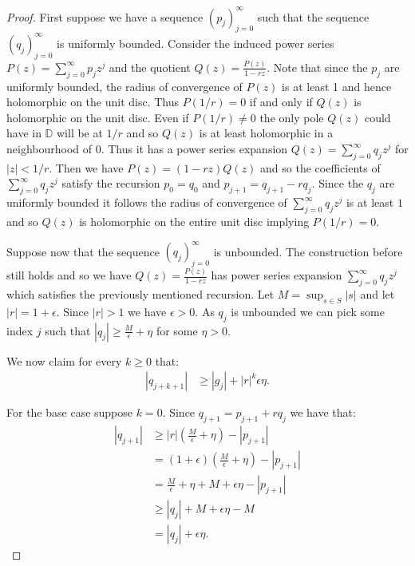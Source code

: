 \documentclass[11pt]{amsart}
\numberwithin{theorem}{section} %
\numberwithin{corollary}{section}
\numberwithin{lemma}{section}
\numberwithin{proposition}{section}
\numberwithin{definition}{section}
\begin{document}
\begin{proof}
First suppose we have a sequence $(p_j)_{j=0}^\infty$ such that the sequence $(q_j)_{j=0}^\infty$ is uniformly bounded. Consider the induced power series $P(z) = \sum_{j=0}^\infty p_jz^j$ and the quotient $Q(z) = \frac{P(z)}{1-rz}$. Note that since the $p_j$ are uniformly bounded, the radius of convergence of $P(z)$ is at least 1 and hence holomorphic on the unit disc. Thus $P(1/r) = 0$ if and only if $Q(z)$ is holomorphic on the unit disc. Even if $P(1/r) \neq 0$ the only pole $Q(z)$ could have in $\mathbb{D}$ will be at $1/r$ and so $Q(z)$ is at least holomorphic in a neighbourhood of $0$. Thus it has a power series expansion $Q(z) = \sum_{j=0}^\infty q_jz^j$ for $|z| < 1/r$. Then we have $P(z) = (1-rz)Q(z)$ and so the coefficients of $\sum_{j=0}^\infty q_jz^j$ satisfy the recursion $p_0 = q_0$ and $p_{j+1} = q_{j+1} - rq_{j}$. Since the $q_j$ are uniformly bounded it follows the radius of convergence of $\sum_{j=0}^\infty q_jz^j$ is at least $1$ and so $Q(z)$ is holomorphic on the entire unit disc implying $P(1/r) = 0$.



\vspace{10pt}

Suppose now that the sequence $(q_j)_{j=0}^\infty$ is unbounded. The construction before still holds and so we have $Q(z) = \frac{P(z)}{1-rz}$ has power series expansion $\sum_{j=0}^\infty q_jz^j$ which satisfies the previously mentioned recursion. Let $M = \sup_{s \in S} |s|$ and let $|r| = 1+\epsilon$. Since $|r| > 1$ we have $\epsilon > 0$. As $q_j$ is unbounded we can pick some index $j$ such that $|q_j| \geqslant \frac{M}{\epsilon} + \eta$ for some $\eta > 0$. 

We now claim for every $k \geqslant 0$ that:
\begin{align*}
|q_{j+k+1}| &\geqslant |g_j| + |r|^k\epsilon\eta.
\end{align*}

For the base case suppose $k=0$. Since $q_{j+1} = p_{j+1} + rq_j$ we have that:
\begin{align*}
|q_{j+1}| &\geqslant |r| \left( \frac{M}{\epsilon} + \eta \right) - |p_{j+1}| \\
&= (1+\epsilon) \left(\frac{M}{\epsilon} + \eta \right) - |p_{j+1}| \\
&= \frac{M}{\epsilon} + \eta + M + \epsilon\eta - |p_{j+1}| \\
&\geqslant |q_j| + M + \epsilon\eta - M \\
&= |q_j| + \epsilon \eta.
\end{align*}


\end{proof}
\end{document}
